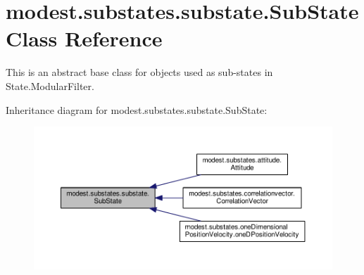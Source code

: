 \hypertarget{classmodest_1_1substates_1_1substate_1_1SubState}{}\section{modest.\+substates.\+substate.\+Sub\+State Class Reference}
\label{classmodest_1_1substates_1_1substate_1_1SubState}


This is an abstract base class for objects used as sub-\/states in State.\+Modular\+Filter.  




Inheritance diagram for modest.\+substates.\+substate.\+Sub\+State\+:
\nopagebreak
\begin{figure}[H]
\begin{center}
\leavevmode
\includegraphics[width=350pt]{classmodest_1_1substates_1_1substate_1_1SubState__inherit__graph}
\end{center}
\end{figure}
